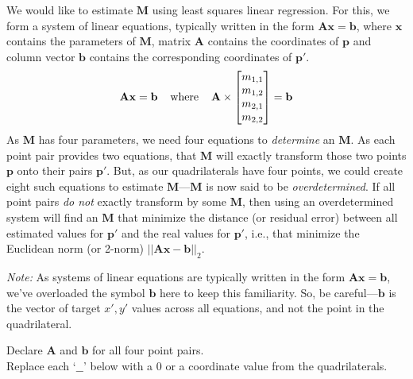 \documentclass{csci1430}
\begin{document}
\clearpage
\begin{subquestion}[points=2,drawbox=false]
We would like to estimate $\mathbf{M}$ using least squares linear regression. For this, we form a system of linear equations, typically written in the form $\mathbf{Ax}=\mathbf{b}$, where $\mathbf{x}$ contains the parameters of $\mathbf{M}$, matrix $\mathbf{A}$ contains the coordinates of $\mathbf{p}$ and column vector $\mathbf{b}$ contains the corresponding coordinates of $\mathbf{p'}$.
\begin{align*}
    \mathbf{Ax}=\mathbf{b} \hspace{0.4cm}\text{where}\hspace{0.4cm} \mathbf{A} \times \begin{bmatrix} m_{1,1} \\ m_{1,2} \\ m_{2,1} \\ m_{2,2} \\ \end{bmatrix} = \mathbf{b}
\end{align*}
%
As $\mathbf{M}$ has four parameters, we need four equations to \emph{determine} an $\mathbf{M}$. As each point pair provides two equations, that $\mathbf{M}$ will exactly transform those two points $\mathbf{p}$ onto their pairs $\mathbf{p'}$. But, as our quadrilaterals have four points, we could create eight such equations to estimate $\mathbf{M}$---$\mathbf{M}$ is now said to be \emph{overdetermined}. If all point pairs \emph{do not} exactly transform by some $\mathbf{M}$, then using an overdetermined system will find an $\mathbf{M}$ that minimize the distance (or residual error) between all estimated values for $\mathbf{p'}$ and the real values for $\mathbf{p'}$, i.e., that minimize the Euclidean norm (or 2-norm) $||\mathbf{A}\mathbf{x} - \mathbf{b}||_2$.

\emph{Note:} As systems of linear equations are typically written in the form $\mathbf{Ax}=\mathbf{b}$, we've overloaded the symbol $\mathbf{b}$ here to keep this familiarity. So, be careful---$\mathbf{b}$ is the vector of target $x',y'$ values across all equations, and not the point in the quadrilateral.
\end{subquestion}

\begin{orangebox}
Declare $\mathbf{A}$ and $\mathbf{b}$ for all four point pairs.\\

Replace each `$\_\_$' below with a $0$ or a coordinate value from the quadrilaterals.
\end{orangebox}
\end{document}
